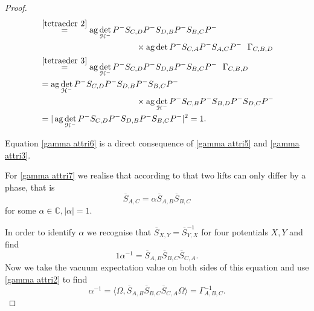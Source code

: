 \documentclass[b5paper,draft,openbib,12pt]{memoir}
\DeclareMathOperator{\ag}{ag}
\begin{document}
\begin{proof}
\begin{align}
&\overset{\eqref{tetraeder 2}}{=}
\ag \det_{\mathcal{H}^-}P^- S_{C,D}P^- S_{D,B}P^-S_{B,C}P^-\\
&\hspace{4cm}\times \ag \det P^- S_{C,A}P^- S_{A,C}P^-     ~~ \Gamma_{C,B,D}\\
&\overset{\eqref{tetraeder 3}}{=}
\ag \det_{\mathcal{H}^-}P^- S_{C,D}P^- S_{D,B}P^-S_{B,C}P^-  ~~ \Gamma_{C,B,D}\\\notag
&=
\ag \det_{\mathcal{H}^-}P^- S_{C,D}P^- S_{D,B}P^-S_{B,C}P^- \\
&\hspace{4cm}\times \ag \det_{\mathcal{H}^-} P^- S_{C,B}P^- S_{B,D}P^- S_{D,C}P^- \\
&=
|\ag \det_{\mathcal{H}^-}P^- S_{C,D}P^- S_{D,B}P^-S_{B,C}P^-|^2=1. 
\end{align}

Equation \eqref{gamma attri6} is a direct consequence of \eqref{gamma attri5} and \eqref{gamma attri3}.

For \eqref{gamma attri7} we realise that according to \cite{ivp0} that two lifts can only differ by a phase,
that is
\begin{equation}
\overline{S}_{A,C}=\alpha \overline{S}_{A,B} \overline{S}_{B,C}
\end{equation}
for some \(\alpha\in \mathbb{C}, |\alpha|=1\). 

In order to identify \(\alpha\) we recognise that \(\overline{S}_{X,Y}=\overline{S}_{Y,X}^{-1}\) for four potentials \(X,Y\) 
and find
\begin{equation}
1 \alpha^{-1}= \overline{S}_{A,B} \overline{S}_{B,C}\overline{S}_{C,A}.
\end{equation}
Now we take the vacuum expectation value on both sides of this equation and use \eqref{gamma attri2} to find
\begin{equation}
\alpha^{-1}=\langle\Omega,\overline{S}_{A,B} \overline{S}_{B,C}\overline{S}_{C,A}\Omega\rangle = \Gamma_{A,B,C}^{-1}.
\end{equation}


\end{proof}
\end{document}
